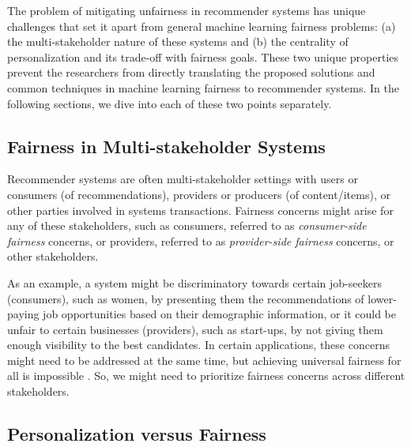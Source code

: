 The problem of mitigating unfairness in recommender systems has unique challenges that set it apart from general machine learning fairness problems: (a) the multi-stakeholder nature of these systems and (b) the centrality of personalization and its trade-off with fairness goals. These two unique properties prevent the researchers from directly translating the proposed solutions and common techniques in machine learning fairness to recommender systems. In the following sections, we dive into each of these two points separately.


\subsection{Fairness in Multi-stakeholder Systems}

Recommender systems are often multi-stakeholder settings with users or consumers (of recommendations), providers or producers (of content/items), or other parties involved in systems transactions. Fairness concerns might arise for any of these stakeholders, such as consumers, referred to as \textit{consumer-side fairness} concerns, or providers, referred to as \textit{provider-side fairness} concerns, or other stakeholders.

As an example, a system might be discriminatory towards certain job-seekers (consumers), such as women, by presenting them the recommendations of lower-paying job opportunities based on their demographic information, or it could be unfair to certain businesses (providers), such as start-ups, by not giving them enough visibility to the best candidates. In certain applications, these concerns might need to be addressed at the same time, but achieving universal fairness for all is impossible \cite{friedler-impossibility-2021}. So, we might need to prioritize fairness concerns across different stakeholders.


\subsection{Personalization versus Fairness}


